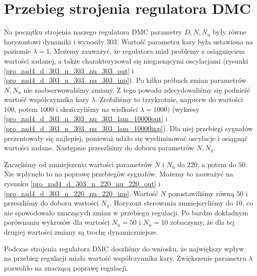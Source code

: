 \section{Przebieg strojenia regulatora DMC}
\label{pro4_DMC}
Na początku strojenia naszego regulatora DMC parametry $D, N, N_{\mathrm{u}}$ były równe horyzontowi dynamiki i wynosiły $303$. Wartość parametru kary była ustawiona na poziomie $\lambda = 1$. Możemy zauważyć, że regulatora miał problemy z osiągnięciem wartości zadanej, a także charakteryzował się niegasnącymi oscylacjami (rysunki \ref{pro_zad4_d_303_n_303_nu_303_out} i \ref{pro_zad4_d_303_n_303_nu_303_inp}). Po kilku próbach zmian parametrów $ N, N_{\mathrm{u}}$ nie zaobserwowaliśmy zmiany. Z tego powodu zdecydowaliśmy się podnieść wartość współczynnika kary $\lambda$. Zrobiliśmy to trzykrotnie, najpierw do wartości $100$, potem $1000$ i skończyliśmy na wielkości $\lambda = 1000)$ (wykresy \ref{pro_zad4_d_303_n_303_nu_303_lam_10000out} i \ref{pro_zad4_d_303_n_303_nu_303_lam_10000inp}). Dla niej przebiegi sygnałów prezentowały się najlepiej, ponieważ udało się wyeliminować oscylacje i osiągnąć wartości zadane. Następnie przeszliśmy do doboru parametrów $ N, N_{\mathrm{u}}$.


Zaczęliśmy od zmniejszenia wartości parametrów $N$ i $N_{\mathrm{u}}$ do $220$, a potem do $50$. Nie wpłynęło to na poprawę przebiegów sygnałów. Możemy to zauważyć na rysunku \ref{pro_zad4_d_303_n_220_nu_220_out} i \ref{pro_zad4_d_303_n_220_nu_220_inp}. Wartość $N$ pozostawiliśmy równą $50$ i przeszliśmy do doboru wartości $N_{u}$. Horyzont sterowania zmniejszyliśmy do $10$, co nie spowodowało znaczących zmian w przebiegu regulacji. Po bardzo dokładnym porównaniu wykresów dla wartości $N_{u} = 50$ i $N_{u} = 10$ zobaczymy, że dla tej drugiej wartości zmiany są trochę dynamiczniejsze. 


Podczas strojenia regulatora DMC doszliśmy do wniosku, że największy wpływ na przebieg regulacji miała wartość współczynnika kary. Zwiększenie parametru $\lambda$ pozwoliło na znaczącą poprawę regulacji. 

